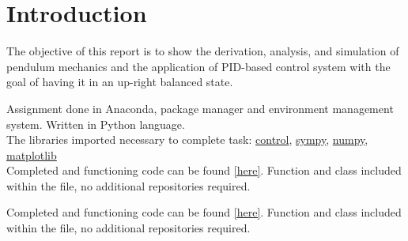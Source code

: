 
\section{Introduction}%
\label{Introduction}
The objective of this report is to show the derivation, analysis, and simulation of pendulum mechanics and the application of PID-based control system with the goal of having it in an up-right balanced state. 

Assignment done in Anaconda, package manager and environment management system. Written in Python language.\\ The libraries imported necessary to complete task: \href{https://anaconda.org/conda-forge/control}{control}, \href{https://anaconda.org/anaconda/sympy}{sympy}, \href{https://anaconda.org/anaconda/numpy}{numpy}, \href{https://anaconda.org/conda-forge/matplotlib}{matplotlib} \\

Completed and functioning code can be found \href{https://gist.github.com/Vensim/adaf1ec6935d5480d76caf70c7c3685d}{[here]}. Function and class included within the file, no additional repositories required.

Completed and functioning code can be found \href{https://gist.github.com/Vensim/adaf1ec6935d5480d76caf70c7c3685d}{[here]}. Function and class included within the file, no additional repositories required.